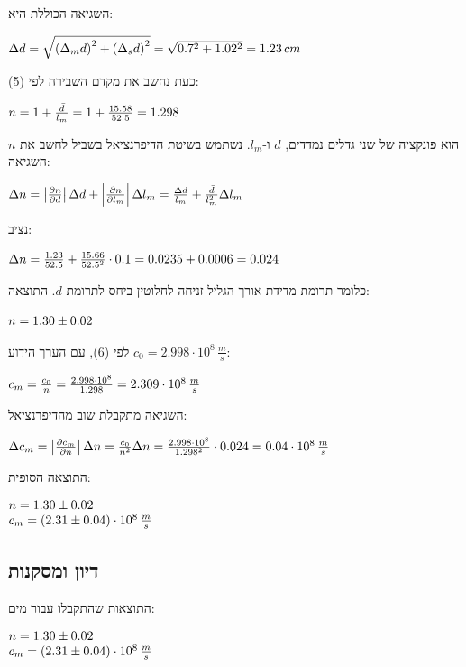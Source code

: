 \documentclass[14pt]{extarticle}
\makeatletter
\newenvironment{lefteqs}{%
    \begin{english}%
    \begin{flushleft}%
    \renewcommand{\arraystretch}{1.3}%
    $\begin{array}{@{}l@{}}%
}{%
    \end{array}$%
    \end{flushleft}%
    \end{english}%
}
\makeatother
\begin{document}
השגיאה הכוללת היא:
\begin{lefteqs}
    \Delta d = \sqrt{\left(\Delta_m d\right)^2 + \left(\Delta_s d\right)^2} = \sqrt{0.7^2 + 1.02^2} = 1.23\,cm
\end{lefteqs}

כעת נחשב את מקדם השבירה לפי (5):
\begin{lefteqs}
    n = 1 + \frac{\bar{d}}{l_m} = 1 + \frac{15.58}{52.5} = 1.298
\end{lefteqs}

$n$ הוא פונקציה של שני גדלים נמדדים, $d$ ו-$l_m$. נשתמש בשיטת הדיפרנציאל בשביל לחשב את השגיאה:
\begin{lefteqs}
    \Delta n = \left| \frac{\partial n}{\partial d} \right| \Delta d + \left| \frac{\partial n}{\partial l_m} \right| \Delta l_m
    = \frac{\Delta d}{l_m} + \frac{\bar{d}}{l_m^2} \Delta l_m
\end{lefteqs}
נציב:
\begin{lefteqs}
    \Delta n = \frac{1.23}{52.5} + \frac{15.66}{52.5^2} \cdot 0.1 = 0.0235 + 0.0006 = 0.024
\end{lefteqs}
כלומר תרומת מדידת אורך הגליל זניחה לחלוטין ביחס לתרומת $d$. התוצאה:
\begin{lefteqs}
    n = 1.30 \pm 0.02
\end{lefteqs}

לפי (6), עם הערך הידוע $c_0 = 2.998 \cdot 10^8\,\frac{m}{s}$:
\begin{lefteqs}
    c_m = \frac{c_0}{n} = \frac{2.998 \cdot 10^8}{1.298} = 2.309 \cdot 10^8\,\frac{m}{s}
\end{lefteqs}

השגיאה מתקבלת שוב מהדיפרנציאל:
\begin{lefteqs}
    \Delta c_m = \left| \frac{\partial c_m}{\partial n} \right| \Delta n = \frac{c_0}{n^2} \Delta n
    = \frac{2.998 \cdot 10^8}{1.298^2} \cdot 0.024 = 0.04 \cdot 10^8\,\frac{m}{s}
\end{lefteqs}

התוצאה הסופית:
\begin{lefteqs}
    n = 1.30 \pm 0.02 \\
    c_m = (2.31 \pm 0.04) \cdot 10^8\,\frac{m}{s}
\end{lefteqs}

\subsection*{דיון ומסקנות}

התוצאות שהתקבלו עבור מים:
\begin{lefteqs}
    n = 1.30 \pm 0.02 \\
    c_m = (2.31 \pm 0.04) \cdot 10^8\,\frac{m}{s}
\end{lefteqs}
\end{document}
